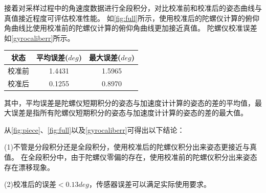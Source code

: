 \documentclass[
  type=master
]{gdutthesis}
\begin{document}
接着对采样过程中的角速度数据进行全段积分，对比校准前和校准后的姿态曲线与真值接近程度可评估校准性能。
如\autoref{fig:full}所示，使用校准后的陀螺仪计算的俯仰角曲线比使用校准前的陀螺仪计算的俯仰角曲线更加接近真值。
陀螺仪校准误差如\autoref{gyrocaliberr}所示。
\begin{table}[H]
	\label{gyrocaliberr}
	\begin{tabular}{ccc}
		\toprule
		状态 & 平均误差($deg$) & 最大误差($deg$) \\
		\midrule
		校准前 & 1.4431 & 1.5965 \\
		校准后 & 0.1255 & 0.8970 \\
		\bottomrule
	\end{tabular}
\end{table}
其中，平均误差是陀螺仪短期积分的姿态与加速度计计算的姿态的差的平均值，最大误差是指所有陀螺仪短期积分的姿态与加速度计计算的姿态的差的最大值。

从\autoref{fig:piece}、\autoref{fig:full}以及\autoref{gyrocaliberr}可得出以下结论：

(1)不管是分段积分还是全段积分，使用校准后的陀螺仪积分出来姿态更接近与真值。
在全段积分中，由于陀螺仪零偏的存在，使用校准前的陀螺仪积分出来姿态存在漂移现象。

(2)校准后的误差$<0.13deg$，传感器误差可以满足实际使用要求。
\end{document}
